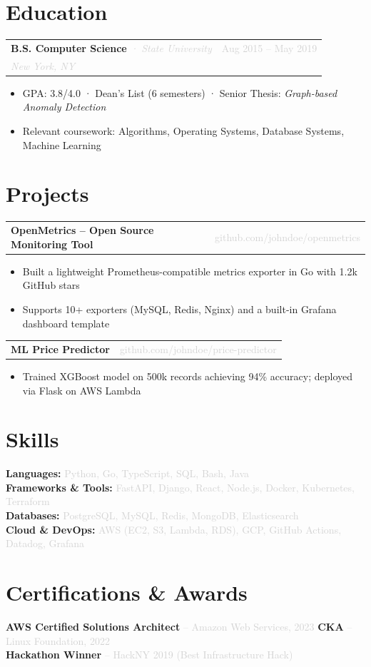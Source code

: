 \documentclass[10pt, letterpaper]{article}
\makeatletter
\newcommand{\resumeEntry}[4]{%
    \vspace{3pt}
    \noindent
    \begin{tabularx}{\linewidth}{@{}X r@{}}
        \textbf{#1} \textit{\textcolor{lightgray}{· #2}} & \textcolor{lightgray}{\small #4}\\
        \textit{\textcolor{lightgray}{\small #3}} & \\
    \end{tabularx}
    \vspace{-4pt}
}
\newcommand{\resumeSimpleEntry}[2]{%
    \vspace{3pt}
    \noindent
    \begin{tabularx}{\linewidth}{@{}X r@{}}
        \textbf{#1} & \textcolor{lightgray}{\small #2}\\
    \end{tabularx}
    \vspace{-4pt}
}
\newcommand{\skillRow}[2]{%
    \noindent\textbf{#1:} \textcolor{lightgray}{#2}\\[2pt]
}
\makeatother
\begin{document}
\section{Education}

\resumeEntry{B.S. Computer Science}{State University}{New York, NY}{Aug 2015 – May 2019}
\begin{itemize}
    \item GPA: 3.8/4.0 · Dean's List (6 semesters) · Senior Thesis: \textit{Graph-based Anomaly Detection}
    \item Relevant coursework: Algorithms, Operating Systems, Database Systems, Machine Learning
\end{itemize}

\section{Projects}

\resumeSimpleEntry{OpenMetrics – Open Source Monitoring Tool}{github.com/johndoe/openmetrics}
\begin{itemize}
    \item Built a lightweight Prometheus-compatible metrics exporter in Go with 1.2k GitHub stars
    \item Supports 10+ exporters (MySQL, Redis, Nginx) and a built-in Grafana dashboard template
\end{itemize}

\resumeSimpleEntry{ML Price Predictor}{github.com/johndoe/price-predictor}
\begin{itemize}
    \item Trained XGBoost model on 500k records achieving 94\% accuracy; deployed via Flask on AWS Lambda
\end{itemize}

\section{Skills}

\skillRow{Languages}{Python, Go, TypeScript, SQL, Bash, Java}
\skillRow{Frameworks \& Tools}{FastAPI, Django, React, Node.js, Docker, Kubernetes, Terraform}
\skillRow{Databases}{PostgreSQL, MySQL, Redis, MongoDB, Elasticsearch}
\skillRow{Cloud \& DevOps}{AWS (EC2, S3, Lambda, RDS), GCP, GitHub Actions, Datadog, Grafana}

\section{Certifications \& Awards}

\noindent
\textbf{AWS Certified Solutions Architect} \textcolor{lightgray}{– Amazon Web Services, 2023} \quad
\textbf{CKA} \textcolor{lightgray}{– Linux Foundation, 2022} \\[2pt]
\textbf{Hackathon Winner} \textcolor{lightgray}{– HackNY 2019 (Best Infrastructure Hack)}
\end{document}
